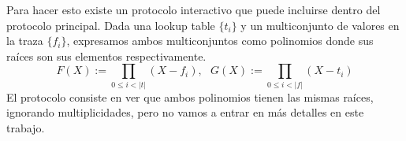 Para hacer esto existe un protocolo interactivo que puede incluirse dentro del protocolo principal. Dada una lookup table $\{t_i\}$ y un multiconjunto de valores en la traza $\{f_i\}$, expresamos ambos multiconjuntos como polinomios donde sus raíces son sus elementos respectivamente.
$$F(X):= \prod_{0 \leq i < |t|}(X-f_i), ~~~ G(X):= \prod_{0 \leq i < |f|}(X-t_i)$$
El protocolo consiste en ver que ambos polinomios tienen las mismas raíces, ignorando multiplicidades, pero no vamos a entrar en más detalles en este trabajo. 
